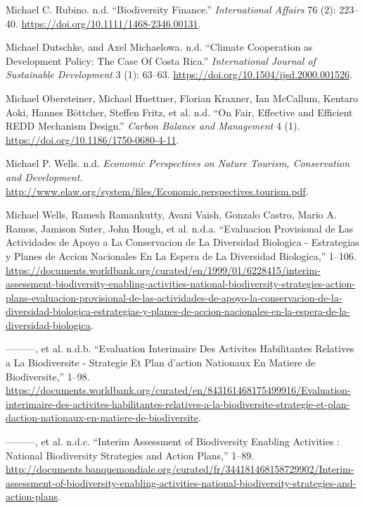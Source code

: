 \begin{CSLReferences}{1}{0}
Michael C. Rubino. n.d. {``Biodiversity Finance.''} \emph{International
Affairs} 76 (2): 223--40. \url{https://doi.org/10.1111/1468-2346.00131}.

Michael Dutschke, and Axel Michaelowa. n.d. {``Climate Cooperation as
Development Policy: The Case Of Costa Rica.''} \emph{International
Journal of Sustainable Development} 3 (1): 63--63.
\url{https://doi.org/10.1504/ijsd.2000.001526}.

Michael Obersteiner, Michael Huettner, Florian Kraxner, Ian McCallum,
Kentaro Aoki, Hannes Böttcher, Steffen Fritz, et al. n.d. {``On Fair,
Effective and Efficient REDD Mechanism Design.''} \emph{Carbon Balance
and Management} 4 (1). \url{https://doi.org/10.1186/1750-0680-4-11}.

Michael P. Wells. n.d. \emph{Economic Perspectives on Nature Tourism,
Conservation and Development}.
\url{http://www.elaw.org/system/files/Economic.perspectives.tourism.pdf}.

Michael Wells, Ramesh Ramankutty, Avani Vaish, Gonzalo Castro, Mario A.
Ramos, Jamison Suter, John Hough, et al. n.d.a. {``Evaluacion
Provisional de Las Actividades de Apoyo a La Conservacion de La
Diversidad Biologica - Estrategias y Planes de Accion Nacionales En La
Espera de La Diversidad Biologica,''} 1--106.
\url{https://documents.worldbank.org/curated/en/1999/01/6228415/interim-assessment-biodiversity-enabling-activities-national-biodiversity-strategies-action-plans-evaluacion-provisional-de-las-actividades-de-apoyo-la-conservacion-de-la-diversidad-biologica-estrategias-y-planes-de-accion-nacionales-en-la-espera-de-la-diversidad-biologica}.

---------, et al. n.d.b. {``Evaluation Interimaire Des Activites
Habilitantes Relatives a La Biodiversite - Strategie Et Plan d'action
Nationaux En Matiere de Biodiversite,''} 1--98.
\url{https://documents.worldbank.org/curated/en/843161468175499916/Evaluation-interimaire-des-activites-habilitantes-relatives-a-la-biodiversite-strategie-et-plan-daction-nationaux-en-matiere-de-biodiversite}.

---------, et al. n.d.c. {``Interim Assessment of Biodiversity Enabling
Activities : National Biodiversity Strategies and Action Plans,''}
1--89.
\url{http://documents.banquemondiale.org/curated/fr/344181468158729902/Interim-assessment-of-biodiversity-enabling-activities-national-biodiversity-strategies-and-action-plans}.


\end{CSLReferences}
